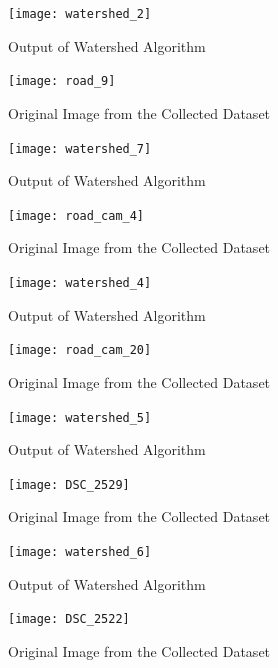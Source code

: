 \documentclass[12pt,a4paper]{article}
\begin{document}
\begin{enumerate}
\begin{enumerate}
    \begin{figure}[ht!]
        \centering
        \texttt{[image: watershed\_2]}
        \caption{Output of Watershed Algorithm}
    \end{figure}
    \pagebreak
    
    \begin{figure}[ht!]
        \centering
        \texttt{[image: road\_9]}
        \caption{Original Image from the Collected Dataset}
    \end{figure}

    \begin{figure}[ht!]
        \centering
        \texttt{[image: watershed\_7]}
        \caption{Output of Watershed Algorithm}
    \end{figure}
    \pagebreak
    
    \begin{figure}[ht!]
        \centering
        \texttt{[image: road\_cam\_4]}
        \caption{Original Image from the Collected Dataset}
    \end{figure}

    \begin{figure}[ht!]
        \centering
        \texttt{[image: watershed\_4]}
        \caption{Output of Watershed Algorithm}
    \end{figure}
    \pagebreak
    
    \begin{figure}[ht!]
        \centering
        \texttt{[image: road\_cam\_20]}
        \caption{Original Image from the Collected Dataset}
    \end{figure}

    \begin{figure}[ht!]
        \centering
        \texttt{[image: watershed\_5]}
        \caption{Output of Watershed Algorithm}
    \end{figure}
    \pagebreak
    
    \begin{figure}[ht!]
        \centering
        \texttt{[image: DSC\_2529]}
        \caption{Original Image from the Collected Dataset}
    \end{figure}

    \begin{figure}[ht!]
        \centering
        \texttt{[image: watershed\_6]}
        \caption{Output of Watershed Algorithm}
    \end{figure}
    \pagebreak
    
    \begin{figure}[ht!]
        \centering
        \texttt{[image: DSC\_2522]}
        \caption{Original Image from the Collected Dataset}
    \end{figure}


\end{enumerate}
\end{enumerate}
\end{document}
